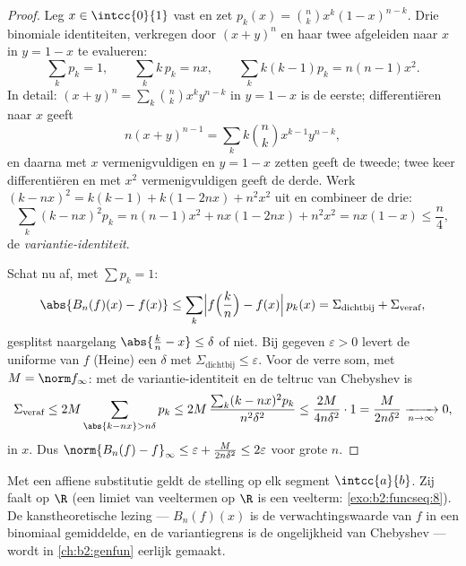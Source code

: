 \begin{proof}
Leg $x \in \intcc{0}{1}$ vast en zet $p_k(x) = \binom nk x^k(1 -
x)^{n-k}$. Drie binomiale identiteiten, verkregen door $(x + y)^n$
en haar twee afgeleiden naar $x$ in $y = 1 - x$ te evalueren:
\[
\sum_k p_k = 1,
\qquad
\sum_k k\,p_k = nx,
\qquad
\sum_k k(k-1) p_k = n(n-1)x^2 .
\]
In detail: $(x+y)^n = \sum_k\binom nk x^ky^{n-k}$ in $y = 1-x$ is
de eerste; differentiëren naar $x$ geeft
\[
n(x+y)^{n-1} = \sum_k k\binom nk x^{k-1}y^{n-k} ,
\]
en daarna met $x$ vermenigvuldigen en $y = 1 - x$ zetten geeft de
tweede; twee keer differentiëren en met $x^2$ vermenigvuldigen
geeft de derde. Werk $(k - nx)^2 = k(k-1) + k(1 - 2nx) + n^2x^2$
uit en combineer de drie:
\[
\sum_k (k - nx)^2 p_k
= n(n-1)x^2 + nx(1 - 2nx) + n^2x^2
= nx(1 - x) \leq \frac n4 ,
\]
de \emph{variantie-identiteit}.

Schat nu af, met $\sum p_k = 1$:
\[
\abs{B_n(f)(x) - f(x)}
\leq \sum_{k} \Bigl| f\Bigl(\frac kn\Bigr) - f(x)\Bigr|\, p_k(x)
= \Sigma_{\text{dichtbij}} + \Sigma_{\text{veraf}} ,
\]
gesplitst naargelang $\abs{\frac kn - x} \leq \delta$ of niet. Bij
gegeven $\varepsilon > 0$ levert de uniforme  van $f$
(Heine) een $\delta$ met $\Sigma_{\text{dichtbij}} \leq
\varepsilon$. Voor de verre som, met $M = \norm f_\infty$: met de
variantie-identiteit en de teltruc van Chebyshev is
\[
\Sigma_{\text{veraf}} \leq 2M \sum_{\abs{k - nx} > n\delta} p_k
\leq 2M\,\frac{\sum_k (k - nx)^2 p_k}{n^2\delta^2}
\leq \frac{2M}{4 n \delta^2} \cdot 1
= \frac{M}{2n\delta^2}
\xrightarrow[n\to\infty]{} 0 ,
\]
 in $x$. Dus $\norm{B_n(f) - f}_\infty \leq \varepsilon +
\frac{M}{2n\delta^2} \leq 2\varepsilon$ voor grote $n$.
\end{proof}

\begin{remark}
Met een affiene substitutie geldt de stelling op elk segment
$\intcc{a}{b}$. Zij faalt op $\R$ (een  limiet van
veeltermen op $\R$ is een veelterm: \cref{exo:b2:funcseq:8}). De
kanstheoretische lezing --- $B_n(f)(x)$ is de verwachtingswaarde
van $f$ in een binomiaal gemiddelde, en de variantiegrens is de
ongelijkheid van Chebyshev --- wordt in \cref{ch:b2:genfun}
eerlijk gemaakt.
\end{remark}

